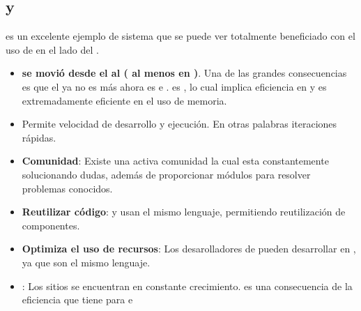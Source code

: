 \subsection{\nodejsNAME y \ecommerce}

\ecommerce es un excelente ejemplo de sistema que se puede ver totalmente beneficiado con el uso de \nodejsNAME en el lado del \serverAS. 

\begin{itemize}
	\item \textbf{\frontEndAS se movió desde el \serverSideAS al \clientSideAS ( al menos en \mobileINT )}. Una de las grandes consecuencias es que el \serverSideAS ya no es más \cpuBoundPC ahora es \memoryBoundPC e \ioBoundPC. \nodejsNAME es \eventdrivenPL, lo cual implica eficiencia en \ioBoundPC y es extremadamente eficiente en el uso de memoria.
	\item Permite velocidad de desarrollo y ejecución. En otras palabras iteraciones rápidas.
	\item \textbf{Comunidad}: Existe una activa comunidad la cual esta constantemente solucionando dudas, además de proporcionar módulos para resolver problemas conocidos.
	\item \textbf{Reutilizar código}: \serverSideAS y \clientSideAS usan el mismo lenguaje, permitiendo reutilización de componentes.
	\item \textbf{Optimiza el uso de recursos}: Los desarolladores de \clientSideAS pueden desarrollar en \serverSideAS, ya que son el mismo lenguaje.
	\item \textbf{\scalabilityQA}: Los sitios \webINT se encuentran en constante crecimiento. \scalabilityQA es una consecuencia de la eficiencia que tiene \nodejsNAME para \memoryBoundPC e \ioBoundPC
\end{itemize}

